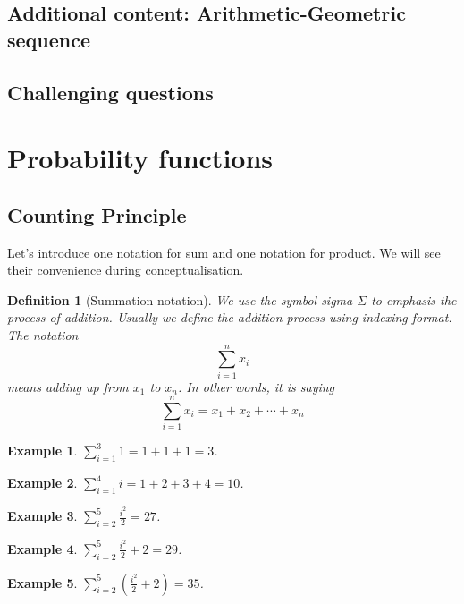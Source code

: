 \documentclass[12pt]{article}
\newtheorem{definition}{Definition}[section]
\newtheorem*{example}{Example}
\begin{document}
    \subsection{Additional content: Arithmetic-Geometric sequence}

    \subsection{Challenging questions}

    \newpage

    \section{Probability functions}

    \subsection{Counting Principle}

    Let's introduce one notation for sum and one notation for product. We will see their convenience during conceptualisation.

    \begin{definition}[Summation notation]
        We use the symbol sigma $\Sigma$ to emphasis the process of addition. Usually we define the addition process using indexing format. The notation $$\sum_{i=1}^{n}x_i$$ means adding up from $x_1$ to $x_n$. In other words, it is saying $$\sum_{i=1}^{n}x_i = x_1+x_2+\cdots+x_n$$
    \end{definition}

    \begin{example}
        $\displaystyle\sum_{i=1}^{3}1 = 1+1+1 = 3$. 
    \end{example}

    \begin{example}
        $\displaystyle\sum_{i=1}^{4}i=1+2+3+4=10$.
    \end{example}

    \begin{example}
        $\displaystyle\sum_{i=2}^{5}\frac{i^2}{2}=27$.
    \end{example}

    \begin{example}
        $\displaystyle\sum_{i=2}^{5}\frac{i^2}{2}+2=29$.
    \end{example}

    \begin{example}
        $\displaystyle\sum_{i=2}^{5}(\frac{i^2}{2}+2)=35$.
    \end{example}
\end{document}
